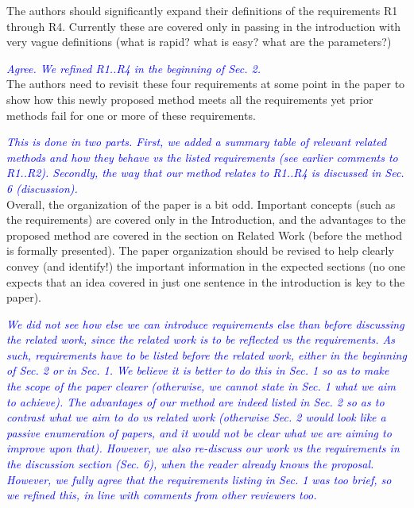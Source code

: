 \documentclass[a4paper,10pt]{article}
\newcommand{\rr}[1]{\emph{\textcolor{blue}{#1}}}
\begin{document}
    The authors should significantly expand their definitions of the requirements R1
    through R4. Currently these are covered only in passing in the introduction with
    very vague definitions (what is rapid? what is easy? what are the parameters?)
    
    \rr{Agree. We refined R1..R4 in the beginning of Sec. 2.}\\

    The authors need to revisit these four requirements at some point in the paper
    to show how this newly proposed method meets all the requirements yet prior
    methods fail for one or more of these requirements.
    
    \rr{This is done in two parts. First, we added a summary table of relevant related methods and how they behave vs the listed requirements (see earlier comments to R1..R2). Secondly, the way that our method relates to R1..R4 is discussed in Sec. 6 (discussion).}\\

    Overall, the organization of the paper is a bit odd. Important concepts (such as
    the requirements) are covered only in the Introduction, and the advantages to the
    proposed method are covered in the section on Related Work (before the method is
    formally presented).  The paper organization should be revised to help clearly
    convey (and identify!) the important information in the expected sections (no one
    expects that an idea covered in just one sentence in the introduction is key to
    the paper).
    
    \rr{We did not see how else we can introduce requirements else than before discussing the related work, since the related work is to be reflected vs the requirements. As such, requirements have to be listed before the related work, either in the beginning of Sec. 2 or in Sec. 1. We believe it is better to do this in Sec. 1 so as to make the scope of the paper clearer (otherwise, we cannot state in Sec. 1 what we aim to achieve). The advantages of our method are indeed listed in Sec. 2 so as to contrast what we aim to do vs related work (otherwise Sec. 2 would look like a passive enumeration of papers, and it would not be clear what we are aiming to improve upon that). However, we also re-discuss our work vs the requirements in the discussion section (Sec. 6), when the reader already knows the proposal. However, we fully agree that the requirements listing in Sec. 1 was too brief, so we refined this, in line with comments from other reviewers too.}\\
\end{document}
